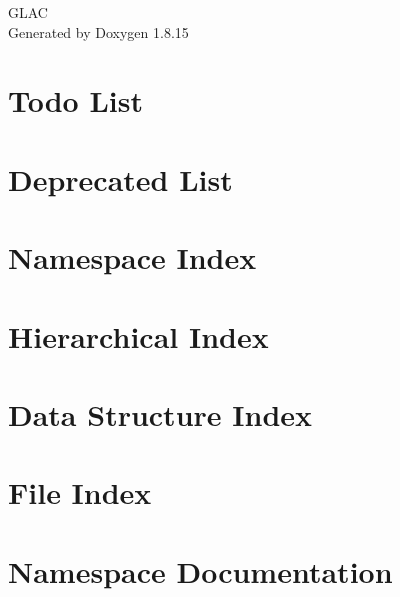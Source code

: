 \let\mypdfximage\pdfximage\def\pdfximage{\immediate\mypdfximage}\documentclass[twoside]{book}
\newcommand{\+}{\discretionary{\mbox{\scriptsize$\hookleftarrow$}}{}{}}
\newcommand{\clearemptydoublepage}{%
  \newpage{\pagestyle{empty}\cleardoublepage}%
}
\begin{document}
\hypersetup{pageanchor=false,
             bookmarksnumbered=true,
             pdfencoding=unicode
            }
\begin{titlepage}
\vspace*{7cm}
\begin{center}%
{\Large G\+L\+AC }\\
\vspace*{1cm}
{\large Generated by Doxygen 1.8.15}\\
\end{center}
\end{titlepage}
\clearemptydoublepage
{}
\tableofcontents
\clearemptydoublepage
{}
\hypersetup{pageanchor=true}

\chapter{Todo List}
\label{todo}

\chapter{Deprecated List}
\label{deprecated}

\chapter{Namespace Index}

\chapter{Hierarchical Index}

\chapter{Data Structure Index}

\chapter{File Index}

\chapter{Namespace Documentation}






\end{document}
